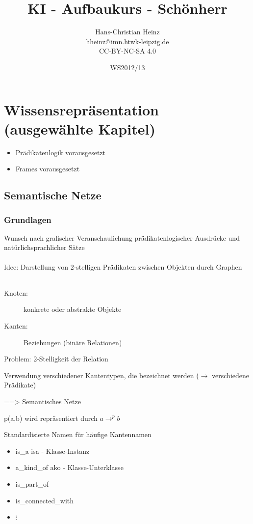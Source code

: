 \documentclass[a4paper,14pt]{article}
\title{KI - Aufbaukurs - Schönherr}
\author{Hans-Christian Heinz\\
hheinz@imn.htwk-leipzig.de\\
CC-BY-NC-SA 4.0}
\date{WS2012/13}
\begin{document}
\maketitle

\tableofcontents


\section{Wissensrepräsentation (ausgewählte Kapitel)}
\begin{itemize}
 \item Prädikatenlogik vorausgesetzt
 \item Frames vorausgesetzt
\end{itemize}

\subsection{Semantische Netze}

\subsubsection{Grundlagen}


Wunsch nach grafischer Veranschaulichung prädikatenlogischer Ausdrücke und natürlichsprachlicher Sätze\\
\\
Idee: Darstellung von 2-stelligen Prädikaten zwischen Objekten durch Graphen\\
\\
\begin{description}
 \item[Knoten:]konkrete oder abstrakte Objekte
 \item[Kanten:]Beziehungen (binäre Relationen)
\end{description}

Problem: 2-Stelligkeit der Relation

Verwendung verschiedener Kantentypen, die bezeichnet werden ($\to$ verschiedene Prädikate)

==> Semantisches Netze

p(a,b) wird repräsentiert durch $a \to^{p} b$

\glqq{}Standardisierte Namen\grqq{} für häufige Kantennamen

\begin{itemize}
 \item is\_a	isa	-	Klasse-Instanz
 \item a\_kind\_of	ako	-	Klasse-Unterklasse
 \item is\_part\_of
 \item is\_connected\_with
 \item $\vdots$
\end{itemize}
\end{document}
